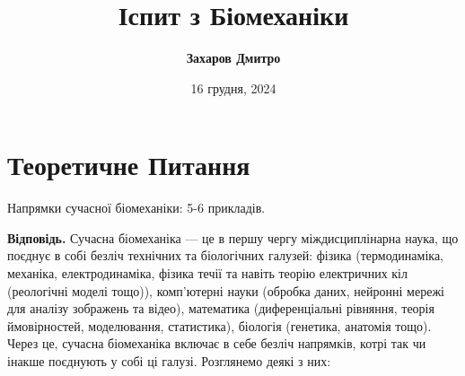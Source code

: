\documentclass{hw_template}
\title{\bfseries Іспит з Біомеханіки}
\author{\bfseries Захаров Дмитро}
\date{16 грудня, 2024}
\begin{document}
\pagestyle{fancy}

\maketitle

\tableofcontents

\vspace{10px}

\section{Теоретичне Питання}

\begin{problems}
    Напрямки сучасної біомеханіки: 5-6 прикладів.
\end{problems}

\textbf{Відповідь.} Сучасна біомеханіка --- це в першу чергу міждисциплінарна
наука, що поєднує в собі безліч технічних та біологічних галузей: фізика
(термодинаміка, механіка, електродинаміка, фізика течії та навіть теорію
електричних кіл (реологічні моделі тощо)), комп'ютерні науки (обробка даних,
нейронні мережі для аналізу зображень та відео), математика (диференціальні
рівняння, теорія ймовірностей, моделювання, статистика), біологія (генетика,
анатомія тощо). Через це, сучасна біомеханіка включає в себе безліч напрямків,
котрі так чи інакше поєднують у собі ці галузі. Розглянемо деякі з них:
\end{document}
